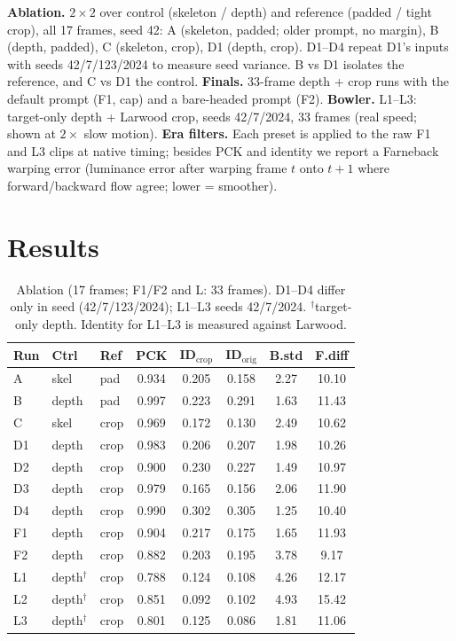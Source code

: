 \documentclass[10pt,twocolumn]{article}
\begin{document}
\textbf{Ablation.} $2{\times}2$ over control (skeleton / depth) and reference (padded / tight crop), all 17 frames, seed
42: A (skeleton, padded; older prompt, no margin), B (depth, padded), C (skeleton, crop), D1 (depth, crop). D1--D4 repeat
D1's inputs with seeds 42/7/123/2024 to measure seed variance. B vs D1 isolates the reference, and C vs D1 the control.
\textbf{Finals.} 33-frame depth + crop runs with the default prompt (F1, cap) and a bare-headed prompt (F2).
\textbf{Bowler.} L1--L3: target-only depth + Larwood crop, seeds 42/7/2024, 33 frames (real speed; shown at
$2{\times}$ slow motion). \textbf{Era filters.} Each preset is applied to the raw F1 and L3 clips at native timing; besides
PCK and identity we report a Farneback warping error (luminance error after warping frame $t$ onto $t{+}1$ where
forward/backward flow agree; lower = smoother).

\section{Results}
\begin{table}[t]
\centering\small
\setlength{\tabcolsep}{3.2pt}
\begin{tabular}{lllccccc}
\toprule
Run & Ctrl & Ref & PCK & ID$_\text{crop}$ & ID$_\text{orig}$ & B.std & F.diff\\
\midrule
A  & skel  & pad  & 0.934 & 0.205 & 0.158 & 2.27 & 10.10\\
B  & depth & pad  & 0.997 & 0.223 & 0.291 & 1.63 & 11.43\\
C  & skel  & crop & 0.969 & 0.172 & 0.130 & 2.49 & 10.62\\
D1 & depth & crop & 0.983 & 0.206 & 0.207 & 1.98 & 10.26\\
D2 & depth & crop & 0.900 & 0.230 & 0.227 & 1.49 & 10.97\\
D3 & depth & crop & 0.979 & 0.165 & 0.156 & 2.06 & 11.90\\
D4 & depth & crop & 0.990 & 0.302 & 0.305 & 1.25 & 10.40\\
\midrule
F1 & depth & crop & 0.904 & 0.217 & 0.175 & 1.65 & 11.93\\
F2 & depth & crop & 0.882 & 0.203 & 0.195 & 3.78 & 9.17\\
\midrule
L1 & depth$^\dagger$ & crop & 0.788 & 0.124 & 0.108 & 4.26 & 12.17\\
L2 & depth$^\dagger$ & crop & 0.851 & 0.092 & 0.102 & 4.93 & 15.42\\
L3 & depth$^\dagger$ & crop & 0.801 & 0.125 & 0.086 & 1.81 & 11.06\\
\bottomrule
\end{tabular}
\caption{Ablation (17 frames; F1/F2 and L: 33 frames). D1--D4 differ only in seed (42/7/123/2024); L1--L3 seeds 42/7/2024.
$^\dagger$target-only depth. Identity for L1--L3 is measured against Larwood.}
\label{tab:ablation}
\end{table}
\end{document}

